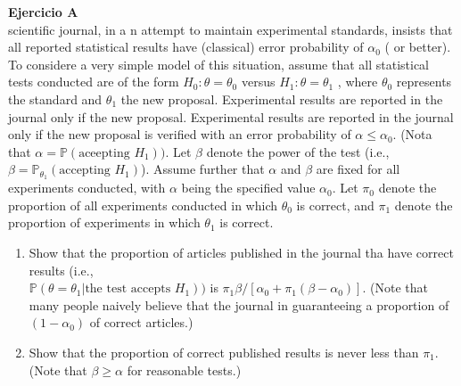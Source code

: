 \documentclass[a4paper, 11pt]{article}
\newenvironment{problem}[2][Ejercicio]
{ \begin{mdframed}[backgroundcolor= red!50] \textbf{#1 #2} \\}
	{  \end{mdframed}}
\begin{document}
\begin{problem}{4} 
    A scientific journal, in a n attempt to maintain experimental standards, insists that all reported statistical results have (classical) error probability of $\alpha_0$ ( or better). To considere a very simple model of this situation, assume that all statistical tests conducted are of the form $ H_0: \theta = \theta_0$ versus $H_1: \theta = \theta_1$ , where $\theta_0$ represents the standard and $\theta_1$ the new proposal. Experimental results are reported in the journal only if the new proposal. Experimental results are reported in the journal only if the new proposal is verified with an error probability of $ \alpha \leq \alpha_0.$ (Nota that $\alpha = \mathbb{P}\left (\text{aceepting $H_1$} \right ))$. Let $\beta$ denote the power of the test (i.e., $\beta = \mathbb{P}_{\theta_1}\left ( \text{accepting } H_1 \right )$). Assume further that $\alpha$ and $\beta$ are fixed for all experiments conducted, with $\alpha$ being the specified value $\alpha_0$. Let $\pi_0$ denote the proportion of all experiments conducted in which $\theta_0$ is correct, and $\pi_1$ denote the proportion of experiments in which $ \theta_1$ is correct. 
    \begin{enumerate}
        \item Show that the proportion of articles published in the journal tha have correct results (i.e., \\
        $\mathbb{P}\left (\theta = \theta_1 | \text{the test accepts $H_1$}\right ))$ is $\pi_1 \beta /[\alpha_0+ \pi_1(\beta-\alpha_0)]$. (Note that many people naively believe that the journal in guaranteeing a proportion of $(1- \alpha_0)$ of correct articles.)
        \item Show that the proportion of correct published results is never less than $\pi_1$. (Note that $\beta \geq \alpha$ for reasonable tests.)
    \end{enumerate}
\end{problem}
\end{document}
